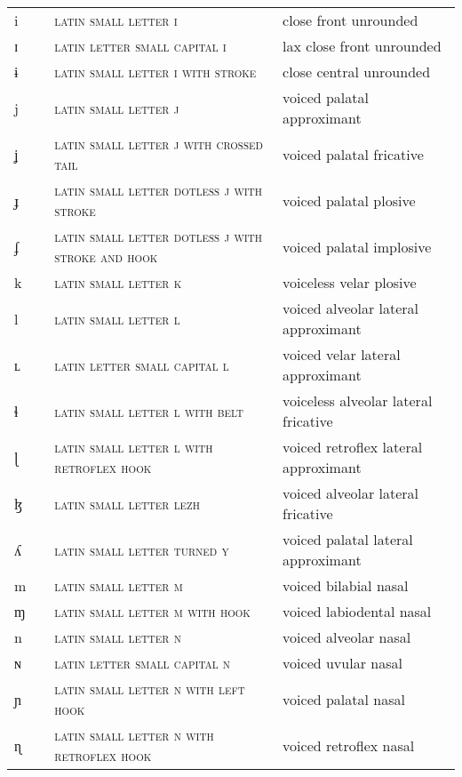 \begin{center}
\begin{xtabular}{ l L{1.2cm} L{5.4cm} L{4.2cm} }
i &  & \textsc{latin small letter i} & close front unrounded \\ 
ɪ &  & \textsc{latin letter small capital i} & lax close front unrounded \\ 
ɨ &  & \textsc{latin small letter i with stroke} & close central unrounded \\ 
j &  & \textsc{latin small letter j} & voiced palatal approximant \\ 
ʝ &  & \textsc{latin small letter j with crossed tail} & voiced palatal fricative \\ 
ɟ &  & \textsc{latin small letter dotless j with stroke} & voiced palatal plosive \\ 
ʄ &  & \textsc{latin small letter dotless j with stroke and hook} & voiced palatal implosive \\ 
k &  & \textsc{latin small letter k} & voiceless velar plosive \\ 
l &  & \textsc{latin small letter l} & voiced alveolar lateral approximant \\ 
ʟ &  & \textsc{latin letter small capital l} & voiced velar lateral approximant \\ 
ɬ &  & \textsc{latin small letter l with belt} & voiceless alveolar lateral fricative \\ 
ɭ &  & \textsc{latin small letter l with retroflex hook} & voiced retroflex lateral approximant \\ 
ɮ &  & \textsc{latin small letter lezh} & voiced alveolar lateral fricative \\ 
ʎ &  & \textsc{latin small letter turned y} & voiced palatal lateral approximant \\ 
m &  & \textsc{latin small letter m} & voiced bilabial nasal \\ 
ɱ &  & \textsc{latin small letter m with hook} & voiced labiodental nasal \\ 
n &  & \textsc{latin small letter n} & voiced alveolar nasal \\ 
ɴ &  & \textsc{latin letter small capital n} & voiced uvular nasal \\ 
ɲ &  & \textsc{latin small letter n with left hook} & voiced palatal nasal \\ 
ɳ &  & \textsc{latin small letter n with retroflex hook} & voiced retroflex nasal \\ 

\end{xtabular}
\end{center}
